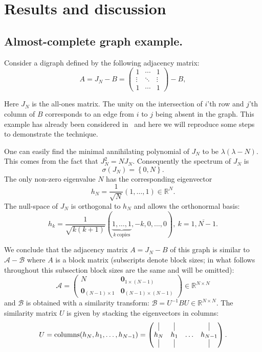 \documentclass[a4paper]{jpconf}
\begin{document}
\section{Results and discussion}

\subsection*{Almost-complete graph example.}

Consider a digraph defined by the following adjacency matrix:
\[
    A = J_N - B = \begin{pmatrix}1 & \cdots & 1 \\ \vdots & \ddots & \vdots \\ 1 & \cdots & 1\end{pmatrix} - B,
\]

Here \( J_N \) is the all-ones matrix.
The unity on the intersection
of \( i \)'th row and \( j \)'th column of \( B \)
corresponds to an edge from \( i \) to \( j \)
being absent in the graph.
This example has already been considered in~\cite{sergekozlukov@volgograd}
and here we will reproduce some steps to demonstrate the technique.

One can easily find the minimal annihilating polynomial of \( J_N \)
    to be \( \lambda(\lambda - N) \).
This comes from the fact that \( J_N^2 = N J_N \).
Consequently the spectrum of \( J_N \) is
\[
    \sigma(J_N) = \left\{0, N\right\}.
\]
The only non-zero eigenvalue \( N \) has the corresponding eigenvector
\[
    h_N = \frac{1}{\sqrt{N}} \left(1, \ldots, 1\right)\in\mathbb{R}^N.
\]
The null-space of \( J_N \) is orthogonal to \( h_N \)
    and allows the orthonormal basis:
\[
    h_k = \frac{1}{\sqrt{k(k+1)}} \left(\underbrace{1, \ldots, 1}_{k\ \text{copies}}, -k, 0, \ldots, 0\right),\ k=\overline{1, N-1}.
\]

We conclude that the adjacency matrix \( A = J_N - B \) of this graph
    is similar to \( \mathcal{A} - \mathcal{B} \)
    where \( A \) is a block matrix (subscripts denote block sizes; in what follows throughout this subsection block sizes are the same and will be omitted):
    \[
        \mathcal{A} = \left(\begin{array}{c|c}
        N & \mathbf{0}_{1{\times}(N{-}1)} \\ \hline
            \mathbf{0}_{(N{-}1){\times}1} & \mathbf{0}_{(N{-}1){\times}(N{-}1)}
        \end{array}\right) \in \mathbb{R}^{N{\times}N}
    \]
    and \( \mathcal{B} \) is obtained with a similarity transform:
    \(
        \mathcal{B} = U^{-1} B U \in \mathbb{R}^{N{\times}N}.
    \)
The similarity matrix \( U \) is given by stacking the eigenvectors in columns:
    \[
        U = \operatorname{columns}(h_N, h_1, \ldots, h_{N-1}) =
        \begin{pmatrix}
            \vline & \vline &        & \vline \\
            h_N    & h_1    & \ldots & h_{N-1} \\
            \vline & \vline &        & \vline

        \end{pmatrix}.
    \]
\end{document}
